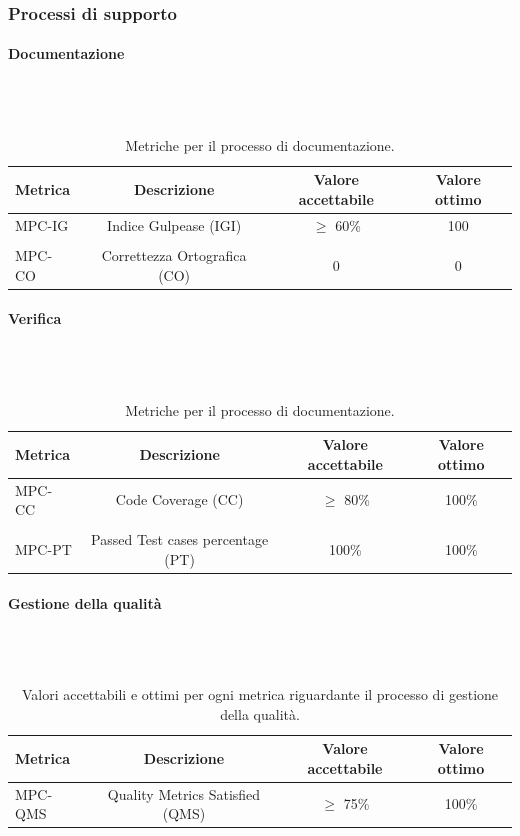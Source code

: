 \documentclass[8pt]{article}
\newcommand{\subsubsubsection}[1]{\paragraph{#1}\mbox{}\\\\}
\begin{document}
\subsubsection{Processi di supporto}
\subsubsubsection{Documentazione}
\begin{table}[h]	
	\centering
	\begin{tabular}{lccc}
		\toprule
		\textbf{Metrica}& \textbf{Descrizione} & \textbf{Valore accettabile} & \textbf{Valore ottimo} \\
		\midrule
		MPC-IG & Indice Gulpease (IGI) & $\geq$ 60\% & 100 \\\\
		MPC-CO & Correttezza Ortografica (CO) & 0 & 0 \\
		\bottomrule
	\end{tabular}
	\caption{Metriche per il processo di documentazione.}
	\label{table:Tabella delle metriche per il processo di documentazione}
\end{table}
\subsubsubsection{Verifica}
\begin{table}[h]	
	\centering
	\begin{tabular}{lccc}
		\toprule
		\textbf{Metrica}& \textbf{Descrizione} & \textbf{Valore accettabile} & \textbf{Valore ottimo} \\
		\midrule
		MPC-CC & Code Coverage (CC) & $\geq$ 80\% & 100\% \\\\
		MPC-PT & Passed Test cases percentage (PT) & 100\% & 100\% \\
		\bottomrule
	\end{tabular}
	\caption{Metriche per il processo di documentazione.}
	\label{table:Tabella delle metriche per il processo di documentazione}
\end{table}
\subsubsubsection{Gestione della qualità}
\begin{table}[H]	
	\centering
	\begin{tabular}{lccc}
		\toprule
		\textbf{Metrica}& \textbf{Descrizione} & \textbf{Valore accettabile} & \textbf{Valore ottimo} \\
		\midrule
		MPC-QMS & Quality Metrics Satisfied (QMS) & $\geq$ 75\%& 100\%\\
		\bottomrule
	\end{tabular}
	\caption{Valori accettabili e ottimi per ogni metrica riguardante il processo di gestione della qualità.}
	\label{table:Valori accettabili e ottimi per ogni metrica riguardante il processo di gestione della qualità.}
\end{table}
\clearpage
\end{document}
